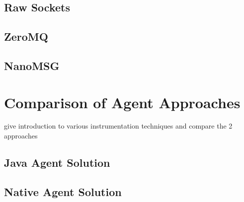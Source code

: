 \subsection{Raw Sockets}
\subsection{ZeroMQ}
\subsection{NanoMSG}

\section{Comparison of Agent Approaches}
give introduction to various instrumentation techniques and compare the 2 approaches
\subsection{Java Agent Solution}
\subsection{Native Agent Solution}

